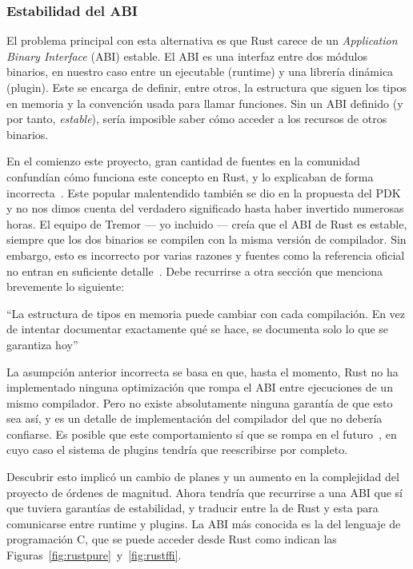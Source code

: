\subsubsection{Estabilidad del ABI}\label{sec:abi}

El problema principal con esta alternativa es que Rust carece de un
\emph{Application Binary Interface} (ABI) estable. El ABI es una interfaz entre
dos módulos binarios, en nuestro caso entre un ejecutable (runtime) y una
librería dinámica (plugin). Este se encarga de definir, entre otros, la
estructura que siguen los tipos en memoria y la convención usada para llamar
funciones. Sin un ABI definido (y por tanto, \emph{estable}), sería imposible
saber cómo acceder a los recursos de otros binarios.

En el comienzo este proyecto, gran cantidad de fuentes en la comunidad
confundían cómo funciona este concepto en Rust, y lo explicaban de forma
incorrecta~\cite{wrongabi1}\cite{wrongabi2}\cite{wrongabi3}\cite{wrongabi4}.
Este popular malentendido también se dio en la propuesta del PDK y no nos dimos
cuenta del verdadero significado hasta haber invertido numerosas horas. El
equipo de Tremor --- yo incluido --- creía que el ABI de Rust es estable,
siempre que los dos binarios se compilen con la misma versión de compilador. Sin
embargo, esto es incorrecto por varias razones y fuentes como la referencia
oficial no entran en suficiente detalle~\cite[Application Binary Interface
(ABI)]{rustref}. Debe recurrirse a otra sección que menciona brevemente lo
siguiente:

``La estructura de tipos en memoria puede cambiar con cada compilación. En vez
de intentar documentar exactamente qué se hace, se documenta solo lo que se
garantiza hoy''~\cite[Type Layout]{rustref}

La asumpción anterior incorrecta se basa en que, hasta el momento, Rust no ha
implementado ninguna optimización que rompa el ABI entre ejecuciones de un mismo
compilador. Pero no existe absolutamente ninguna garantía de que esto sea así, y
es un detalle de implementación del compilador del que no debería confiarse. Es
posible que este comportamiento sí que se rompa en el
futuro~\cite{randomizelayout}, en cuyo caso el sistema de plugins tendría que
reescribirse por completo.

Descubrir esto implicó un cambio de planes y un aumento en la complejidad del
proyecto de órdenes de magnitud. Ahora tendría que recurrirse a una ABI que sí
que tuviera garantías de estabilidad, y traducir entre la de Rust y esta para
comunicarse entre runtime y plugins. La ABI más conocida es la del lenguaje de
programación C, que se puede acceder desde Rust como indican las
Figuras~\ref{fig:rustpure}~y~\ref{fig:rustffi}.

